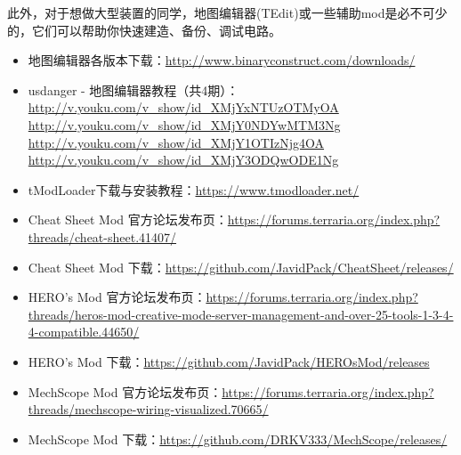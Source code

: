此外，对于想做大型装置的同学，地图编辑器(TEdit)或一些辅助mod是必不可少的，它们可以帮助你快速建造、备份、调试电路。
\begin{itemize}
\item
地图编辑器各版本下载：\url{http://www.binaryconstruct.com/downloads/}
\item
usdanger - 地图编辑器教程（共4期）：\\
\url{http://v.youku.com/v_show/id_XMjYxNTUzOTMyOA} \\
\url{http://v.youku.com/v_show/id_XMjY0NDYwMTM3Ng}\\
\url{http://v.youku.com/v_show/id_XMjY1OTIzNjg4OA}\\
\url{http://v.youku.com/v_show/id_XMjY3ODQwODE1Ng}
\item
tModLoader下载与安装教程：\url{https://www.tmodloader.net/}
\item
Cheat Sheet Mod 官方论坛发布页：\url{https://forums.terraria.org/index.php?threads/cheat-sheet.41407/}
\item
Cheat Sheet Mod 下载：\url{https://github.com/JavidPack/CheatSheet/releases/}
\item
HERO's Mod 官方论坛发布页：\url{https://forums.terraria.org/index.php?threads/heros-mod-creative-mode-server-management-and-over-25-tools-1-3-4-4-compatible.44650/}
\item
HERO's Mod 下载：\url{https://github.com/JavidPack/HEROsMod/releases}
\item MechScope Mod 官方论坛发布页：\url{https://forums.terraria.org/index.php?threads/mechscope-wiring-visualized.70665/}
\item MechScope Mod 下载：\url{https://github.com/DRKV333/MechScope/releases/}
\end{itemize}

